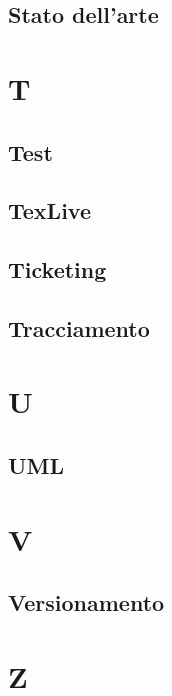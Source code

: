 \documentclass[12pt]{article}
\begin{document}
		\subsection{Stato dell'arte}
	\clearpage
	\section{T}
		\subsection{Test}
		\subsection{TexLive}
		\subsection{Ticketing}
		\subsection{Tracciamento}
	\clearpage
	\section{U}
		\subsection{UML}
	\clearpage
	\section{V}
		\subsection{Versionamento}
	\clearpage
	\section{Z}	
\end{document}
